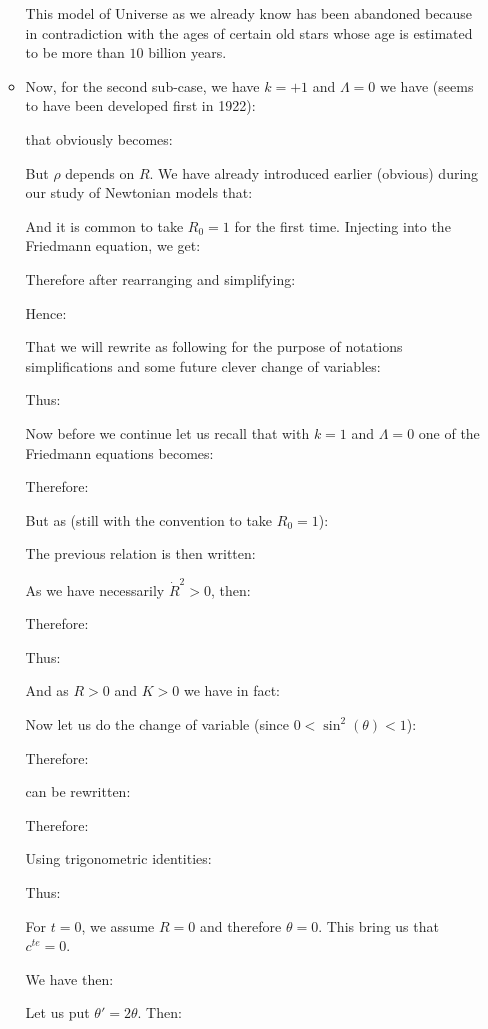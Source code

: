 \begin{itemize}
\begin{itemize}
				This model of Universe as we already know has been abandoned because in contradiction with the ages of certain old stars whose age is estimated to be more than $10$ billion years.

				\item Now, for the second sub-case, we have $k=+1$ and $\Lambda=0$ we have (seems to have been developed first in 1922):
				
				that obviously becomes:
				
				But $\rho$ depends on $R$. We have already introduced earlier (obvious) during our study of Newtonian models that:
				
				And it is common to take $R_0=1$ for the first time. Injecting into the Friedmann equation, we get:
				
				Therefore after rearranging and simplifying:
				
				Hence:
				
				That we will rewrite as following for the purpose of notations simplifications and some future clever change of variables:
				
				Thus:
				
				Now before we continue let us recall that with $k=1$ and $\Lambda=0$ one of the Friedmann equations becomes:
				
				Therefore:
				
				But as (still with the convention to take $R_0=1$):
				
				The previous relation is then written:
				
				As we have necessarily $\dot{R}^2>0$, then:
				
				Therefore:
				
				Thus:
				
				And as $R>0$ and $K>0$ we have in fact:
				
				Now let us do the change of variable (since $0<\sin^2(\theta)<1$):
				
				Therefore:
				
				can be rewritten:
				
				Therefore:
				
				Using trigonometric identities:
				
				Thus:
				
				For $t=0$, we assume $R=0$ and therefore $\theta=0$. This bring us that $c^{te}=0$.
				
				We have then:
				
				Let us put $\theta'=2\theta$. Then:
				

\end{itemize}
\end{itemize}
